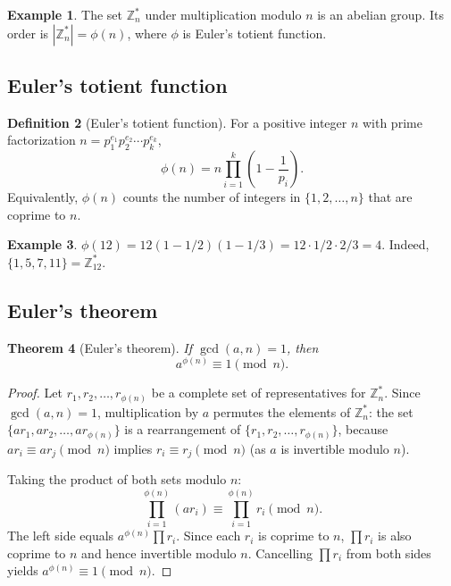 \documentclass[twoside,12pt]{book}
\theoremstyle{plain}
\newtheorem{theorem}{Theorem}[chapter]
\theoremstyle{definition}
\newtheorem{definition}[theorem]{Definition}
\newtheorem{example}[theorem]{Example}
\theoremstyle{remark}
\begin{document}
\begin{example}
The set $\mathbb{Z}_n^*$ under multiplication modulo $n$ is an abelian group. Its order is $|\mathbb{Z}_n^*| = \phi(n)$, where $\phi$ is Euler's totient function.
\end{example}

\subsection{Euler's totient function}

\begin{definition}[Euler's totient function]
For a positive integer $n$ with prime factorization $n = p_1^{e_1} p_2^{e_2} \cdots p_k^{e_k}$,
\[
\phi(n) = n \prod_{i=1}^{k} \left(1 - \frac{1}{p_i}\right).
\]
Equivalently, $\phi(n)$ counts the number of integers in $\{1, 2, \ldots, n\}$ that are coprime to $n$.
\end{definition}

\begin{example}
$\phi(12) = 12(1 - 1/2)(1 - 1/3) = 12 \cdot 1/2 \cdot 2/3 = 4$. Indeed, $\{1, 5, 7, 11\} = \mathbb{Z}_{12}^*$.
\end{example}

\subsection{Euler's theorem}

\begin{theorem}[Euler's theorem]
\label{thm:euler}
If $\gcd(a, n) = 1$, then
\[
a^{\phi(n)} \equiv 1 \pmod{n}.
\]
\end{theorem}

\begin{proof}
Let $r_1, r_2, \ldots, r_{\phi(n)}$ be a complete set of representatives for $\mathbb{Z}_n^*$. Since $\gcd(a, n) = 1$, multiplication by $a$ permutes the elements of $\mathbb{Z}_n^*$: the set $\{ar_1, ar_2, \ldots, ar_{\phi(n)}\}$ is a rearrangement of $\{r_1, r_2, \ldots, r_{\phi(n)}\}$, because $ar_i \equiv ar_j \pmod{n}$ implies $r_i \equiv r_j \pmod{n}$ (as $a$ is invertible modulo $n$).

Taking the product of both sets modulo $n$:
\[
\prod_{i=1}^{\phi(n)} (ar_i) \equiv \prod_{i=1}^{\phi(n)} r_i \pmod{n}.
\]
The left side equals $a^{\phi(n)} \prod r_i$. Since each $r_i$ is coprime to $n$, $\prod r_i$ is also coprime to $n$ and hence invertible modulo $n$. Cancelling $\prod r_i$ from both sides yields $a^{\phi(n)} \equiv 1 \pmod{n}$.
\end{proof}
\end{document}
